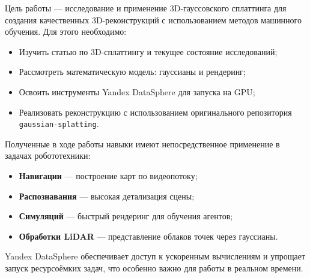 \Introduction


Цель работы — исследование и применение 3D-гауссовского сплаттинга для создания качественных 3D-реконструкций с использованием методов машинного обучения. Для этого необходимо:

\begin{itemize}
    \item Изучить статью по 3D-сплаттингу и текущее состояние исследований;
    \item Рассмотреть математическую модель: гауссианы и рендеринг;
    \item Освоить инструменты Yandex DataSphere для запуска на GPU;
    \item Реализовать реконструкцию с использованием оригинального репозитория \texttt{gaussian-splatting}.
\end{itemize}

\bigskip




Полученные в ходе работы навыки имеют непосредственное применение в задачах робототехники:
\begin{itemize}
    \item \textbf{Навигации} — построение карт по видеопотоку;
    \item \textbf{Распознавания} — высокая детализация сцены;
    \item \textbf{Симуляций} — быстрый рендеринг для обучения агентов;
    \item \textbf{Обработки LiDAR} — представление облаков точек через гауссианы.
\end{itemize}

Yandex DataSphere обеспечивает доступ к ускоренным вычислениям и упрощает запуск ресурсоёмких задач, что особенно важно для работы в реальном времени.
